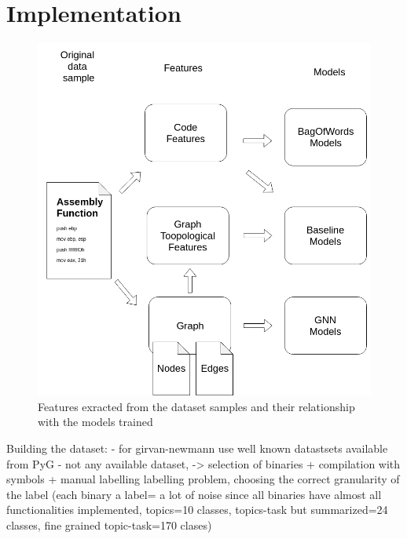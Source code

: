 \section{Implementation}












\begin{figure}[H]
    \centering
        \includegraphics[width=0.95\linewidth]{img/Features_and_models_diagram.png}
    \caption{Features exracted from the dataset samples and their relationship with the models trained}\label{fig:Features_diagram}
\end{figure}



Building the dataset:
	- for girvan-newmann use well known datastsets available from PyG
	- not any available dataset, -> selection of binaries + compilation with symbols 
	 + manual labelling
	labelling problem, choosing the correct granularity of the label (each binary a label= a lot of noise since all binaries have almost all functionalities implemented, topics=10 classes, topics-task but summarized=24 classes, fine grained topic-task=170 clases)
